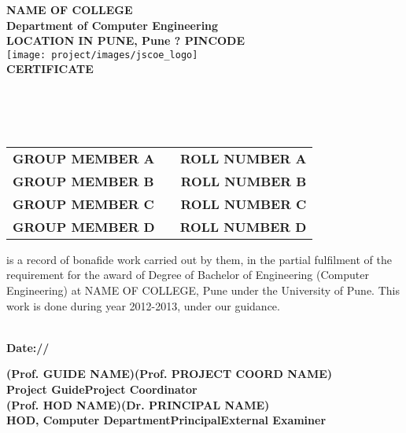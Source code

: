 \begin{center}
\thispagestyle{empty}

\LARGE{\textbf{NAME OF COLLEGE}} \\ 
\large{\textbf{Department of Computer Engineering}}\\
\large{\textbf{LOCATION IN PUNE, Pune ? PINCODE}}\\[0.5cm]

\texttt{[image: project/images/jscoe\_logo]}\\[0.5cm]

{\Huge \textbf{CERTIFICATE}}\\[0.5cm]
\end{center}
\linespread{1.13}
\large{\\[0.2cm]
\textbf{\Large{}}\\[0.2cm]
\\[0.2cm]
\begin{table}[h]
\centering
\large{
\begin{tabular}{>{\bfseries}lc>{\bfseries}r}
GROUP MEMBER A & & ROLL NUMBER A\\GROUP MEMBER B & & ROLL NUMBER B\\GROUP MEMBER C & & ROLL NUMBER C\\GROUP MEMBER D & & ROLL NUMBER D\\
\end{tabular}}
\end{table}
 is a record of bonafide work carried out by them, in the partial
 fulfilment of the requirement for the award of Degree of Bachelor of
 Engineering (Computer Engineering) at NAME OF COLLEGE, Pune under the 
 University of Pune. This work is done
 during year 2012-2013, under our guidance.}\\[0.5cm]
\large{\textbf{Date:\hspace*{1.0cm}/\hspace*{1.0cm}/}}\\
\begin{spacing}{0}
\vspace{3.0cm}
\large{\textbf{(Prof. GUIDE NAME)}}\hspace*{1.2in}\large{\textbf{(Prof. PROJECT COORD NAME)}}\\
\hspace*{0.7in}\textbf{Project Guide}\hspace*{2.3in}\textbf{Project Coordinator}\\[3cm]
\hspace*{0.5cm}\large{\textbf{(Prof. HOD NAME)}}\hspace*{0.8in}\large{\textbf{(Dr. PRINCIPAL NAME)}}\\
\textbf{HOD, Computer Department}\hspace*{0.8in}\textbf{Principal}\hspace*{1.1in}\textbf{External Examiner}
\end{spacing}
